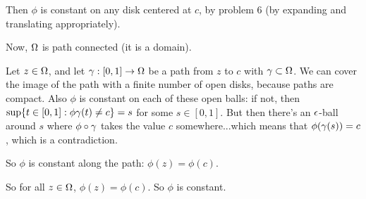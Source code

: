 \documentclass[a4paper,12pt]{article}
\begin{document}
Then $\phi$ is constant on any disk centered at $c$, by problem 6 (by expanding and translating appropriately).

Now, $\Omega$ is path connected (it is a domain).

Let $z \in \Omega$, and let $\gamma: [0,1] \to \Omega$ be a path from $z$ to $c$ with $\gamma \subset \Omega$. We can cover the image of the path with a finite number of open disks, because paths are compact. Also $\phi$ is constant on each of these open balls: if not, then $\sup\{t \in [0,1]: \phi\gamma(t) \neq c\} = s$ for some $s \in [0,1]$. But then there's an $\epsilon$-ball around $s$ where $\phi\circ\gamma$ takes the value $c$ somewhere...which means that $\phi(\gamma(s)) = c$, which is a contradiction. 

So $\phi$ is constant along the path: $\phi(z) = \phi(c)$.

So for all $z \in \Omega$, $\phi(z) = \phi(c)$. So $\phi$ is constant.

\shunt
\end{document}
